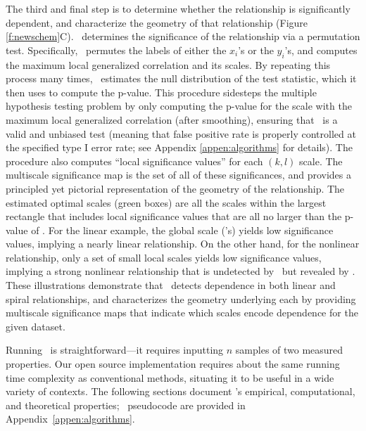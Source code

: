 \documentclass[11pt]{extarticle}
\begin{document}
The third and final step is to determine whether the relationship is significantly dependent, and characterize the geometry of that relationship (Figure \ref{f:newschem}{\color{magenta}C}).
\Mgc~determines the significance of the relationship via a permutation test.
Specifically, \Mgc~permutes the labels of either the $x_i$'s or the $y_i$'s, and computes the maximum local generalized correlation and its scales.
By repeating this process many times, \Mgc~estimates the null distribution of the test statistic, which it then uses to compute the p-value.
This procedure sidesteps the multiple hypothesis testing problem  by only computing the p-value for the scale with the maximum local generalized correlation (after smoothing), ensuring that \Mgc~is a valid and unbiased test (meaning that false positive rate is properly controlled at the specified type I error rate; see Appendix \ref{appen:algorithms} for details).
The procedure also computes ``local significance values''  for each $(k,l)$ scale.  The multiscale significance map is the set of all of these significances, and provides a principled yet pictorial representation of the geometry of the relationship.
The estimated optimal scales (green boxes) are all the scales within the largest rectangle that includes local significance values that are all no larger than the p-value of \Mgc.
For the linear example, the global scale (\Dcorr's) yields low significance values, implying a nearly linear relationship.
On the other hand, for the nonlinear relationship, only a set of small local scales yields low significance values, implying a strong nonlinear relationship that is undetected by \Dcorr~but revealed by \Mgc.
These illustrations  demonstrate that \Mgc~detects dependence in both linear and spiral relationships, and characterizes the geometry underlying each by providing multiscale significance maps that indicate which scales encode dependence for the given dataset.

Running \Mgc~is straightforward---it requires inputting $n$ samples of two measured properties.
Our open source implementation\footnotemark{} requires about the same running  time complexity as conventional methods, situating it to be useful in a wide variety of contexts.
The following sections document \Mgc's empirical, computational, and theoretical properties; \Mgc~pseudocode are provided in Appendix~\ref{appen:algorithms}.
\end{document}
